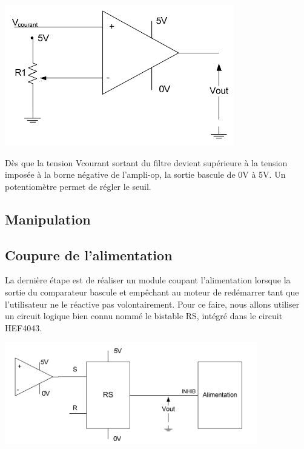 \documentclass{../template/tp}
\begin{document}
\begin{center}
\includegraphics[width=10cm]{sch8}
\end{center}

Dès que la tension Vcourant sortant du filtre devient supérieure à la tension imposée à la borne négative
de l'ampli-op, la sortie bascule de 0V à 5V. Un potentiomètre permet de régler le seuil.

\subsection{Manipulation}




\subsection{Coupure de l'alimentation}

La dernière étape est de réaliser un module coupant l'alimentation lorsque la sortie du comparateur
bascule et empêchant au moteur de redémarrer tant que l'utilisateur ne le réactive pas volontairement.
Pour ce faire, nous allons utiliser un circuit logique bien connu nommé le bistable RS, intégré dans le
circuit HEF4043.

\begin{center}
\includegraphics[width=11cm]{sch9}
\end{center}
\end{document}
